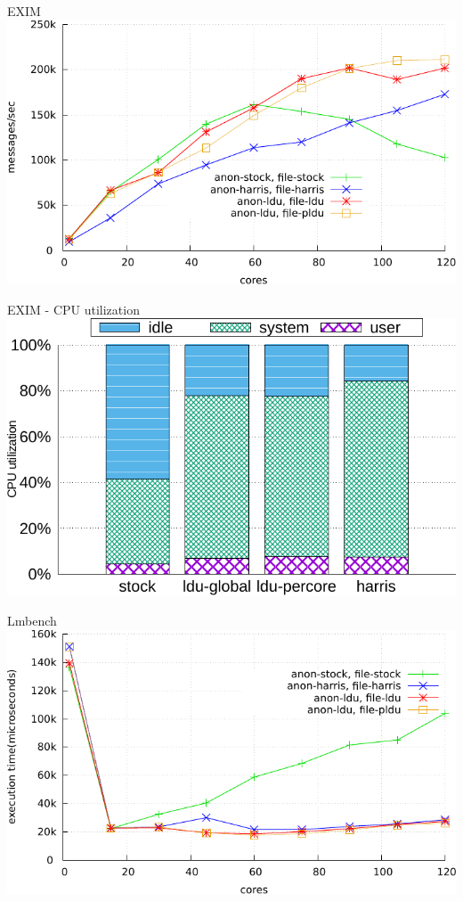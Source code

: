 \documentclass[english]{beamer} %
\begin{document}
\begin{frame}{EXIM}
\includegraphics[scale=0.8]{graph/exim}
\end{frame}


\begin{frame}{EXIM - CPU utilization}
\includegraphics[scale=0.8]{graph/exim_cpuutils}
\end{frame}


\begin{frame}{Lmbench}
\includegraphics[scale=0.8]{graph/lmbench}
\end{frame}
\end{document}
